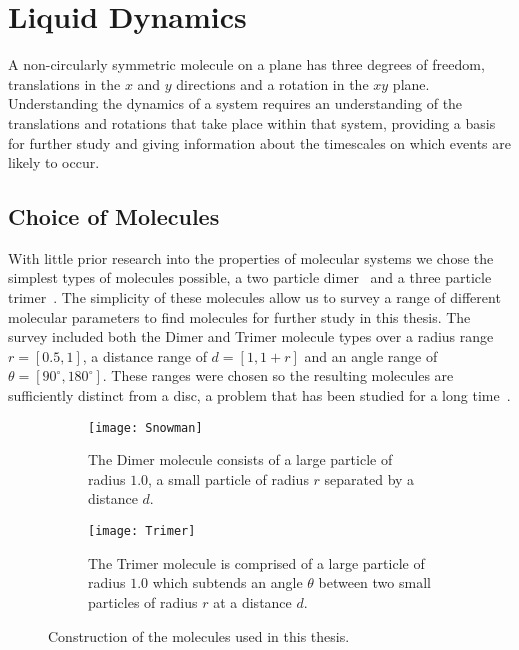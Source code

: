 \chapter{Liquid Dynamics}

A non-circularly symmetric molecule on a plane has three degrees of freedom, translations in the $x$ and $y$ directions and a rotation in the $xy$ plane. Understanding the dynamics of a system requires an understanding of the translations and rotations that take place within that system, providing a basis for further study and giving information about the timescales on which events are likely to occur.

\section{Choice of Molecules}

With little prior research into the properties of molecular systems we chose the simplest types of molecules possible, a two particle dimer~ and a three particle trimer~. The simplicity of these molecules allow us to survey a range of different molecular parameters to find molecules for further study in this thesis. The survey included both the Dimer and Trimer molecule types over a radius range $r = [0.5,1]$, a distance range of $d = [1,1+r]$ and an angle range of $\theta = [90^\circ,180^\circ]$. These ranges were chosen so the resulting molecules are sufficiently distinct from a disc, a problem that has been studied for a long time~\cite{verlet:67}.

\begin{figure}
    \centering
    \begin{subfigure}[t]{0.48\textwidth}
        \texttt{[image: Snowman]}
        \caption{The Dimer molecule consists of a large particle of radius $1.0$, a small particle of radius $r$ separated by a distance $d$.}
        \label{fig:dimer}
    \end{subfigure}\hfill
    \begin{subfigure}[t]{0.48\textwidth}
        \texttt{[image: Trimer]}
        \caption{The Trimer molecule is comprised of a large particle of radius $1.0$ which subtends an angle $\theta$ between two small particles of radius $r$ at a distance $d$.}
        \label{fig:trimer}
    \end{subfigure}
    \caption{Construction of the molecules used in this thesis.}
    \label{fig:construction}
\end{figure}

